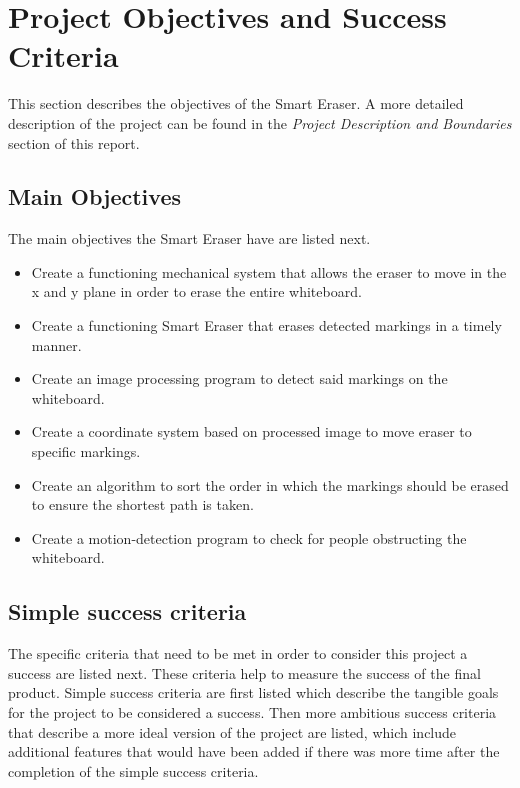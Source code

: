  \section{Project Objectives and Success Criteria}
This section describes the objectives of the Smart Eraser. A more detailed description of the project can be found in the \textit{Project Description and Boundaries} section of this report.
\subsection{Main Objectives}
The main objectives the Smart Eraser have are listed next.
 \begin{itemize}
 \item Create a functioning mechanical system that allows the eraser to move in the x and y plane in order to erase the entire whiteboard.
 \item Create a functioning Smart Eraser that erases detected markings in a timely manner.
 \item Create an image processing program to detect said markings on the whiteboard.
 \item Create a coordinate system based on processed image to move eraser to specific markings.
 \item Create an algorithm to sort the order in which the markings should be erased to ensure the shortest path is taken.
 \item Create a motion-detection program to check for people obstructing the whiteboard.
 \end{itemize} \par

\subsection{Simple success criteria}
\setlength{\parindent}{2.5ex} The specific criteria that need to be met in order to consider this project a success are listed next. These criteria help to measure the success of the final product. Simple success criteria are first listed which describe the tangible goals for the project to be considered a success. Then more ambitious success criteria that describe a more ideal version of the project are listed, which include additional features that would have been added if there was more time after the completion of the simple success criteria.\\

